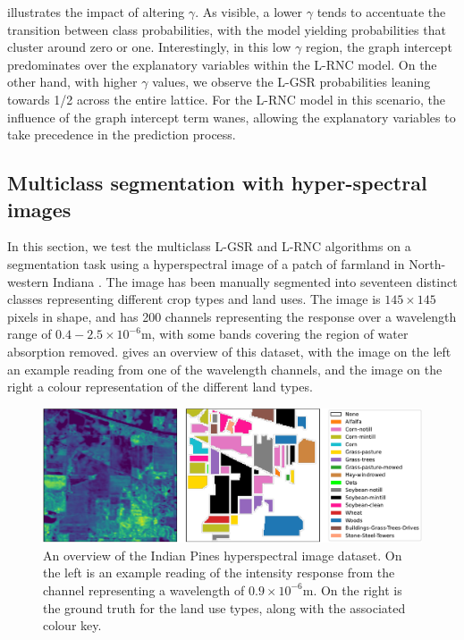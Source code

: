  illustrates the impact of altering $\gamma$. As visible, a lower $\gamma$ tends to accentuate the transition between class probabilities, with the model yielding probabilities that cluster around zero or one. Interestingly, in this low $\gamma$ region, the graph intercept predominates over the explanatory variables within the L-RNC model. On the other hand, with higher $\gamma$ values, we observe the L-GSR probabilities leaning towards 1/2 across the entire lattice. For the L-RNC model in this scenario, the influence of the graph intercept term wanes, allowing the explanatory variables to take precedence in the prediction process.


\subsection{Multiclass segmentation with hyper-spectral images}
 
In this section, we test the multiclass L-GSR and L-RNC algorithms on a segmentation task using a hyperspectral image of a patch of farmland in North-western Indiana \citep{Baumgardner2015}. The image has been manually segmented into seventeen distinct classes representing different crop types and land uses. The image is $145 \times 145$ pixels in shape, and has 200 channels representing the response over a wavelength range of $0.4-2.5 \times 10^{-6}$m, with some bands covering the region of water absorption removed.   gives an overview of this dataset, with the image on the left an example reading from one of the wavelength channels, and the image on the right a colour representation of the different land types. 

\begin{figure}[t] 
    \begin{center}
        \includegraphics[width=\linewidth]{Figures/hyperspectral.pdf}
    \end{center}
    \caption[A visual overview of the Indian Pines hyperspectral image dataset]{An overview of the Indian Pines hyperspectral image dataset. On the left is an example reading of the intensity response from the channel representing a wavelength of $0.9 \times 10^{-6}$m. On the right is the ground truth for the land use types, along with the associated colour key.}
    \label{fig:hyperspectral}
\end{figure}

